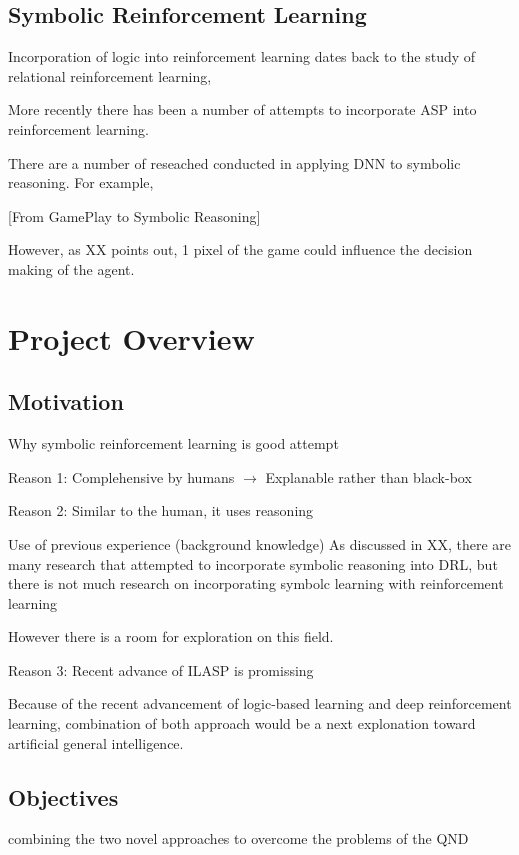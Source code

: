 \documentclass[12pt,twoside]{report}
\begin{document}
\section{Symbolic Reinforcement Learning}
Incorporation of logic into reinforcement learning dates back to the study of relational reinforcement learning,


More recently there has been a number of attempts to incorporate ASP into reinforcement learning.

There are a number of reseached conducted in applying DNN to symbolic reasoning.
For example,

[From GamePlay to Symbolic Reasoning]


However, as XX points out, 1 pixel of the game could influence the decision making of the agent.


\chapter{Project Overview}
\section{Motivation}

Why symbolic reinforcement learning is good attempt


Reason 1: Complehensive by humans $\rightarrow$ Explanable rather than black-box

Reason 2: Similar to the human, it uses reasoning

Use of previous experience (background knowledge)
As discussed in XX, there are many research that attempted to incorporate symbolic reasoning into DRL, but there is not much research on incorporating symbolc learning with reinforcement learning

However there is a room for exploration on this field.

Reason 3: Recent advance of ILASP is promissing

Because of the recent advancement of logic-based learning and deep reinforcement learning, combination of both approach would be a next explonation toward artificial general intelligence.

\section{Objectives}

combining the two novel approaches to overcome the problems of the QND
\end{document}
